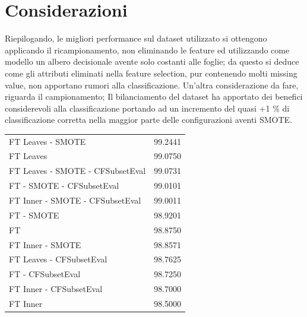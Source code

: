 \section{Considerazioni}
Riepilogando, le migliori performance sul dataset utilizzato si ottengono applicando il ricampionamento, non eliminando le feature ed utilizzando come modello un albero decisionale avente solo costanti alle foglie; da questo si deduce come gli attributi eliminati nella feature selection, pur contenendo molti missing value, non apportano rumori alla classificazione.
Un'altra considerazione da fare, riguarda il campionamento; Il bilanciamento del dataset ha apportato dei benefici considerevoli alla classificazione portando ad un incremento del quasi +1 \% di classificazione corretta nella maggior parte delle configurazioni aventi SMOTE.

\begin{table}[htbp]
	\begin{tabular}{l r}
		FT Leaves - SMOTE & 99.2441 \\
		FT Leaves & 99.0750 \\
		FT Leaves - SMOTE - CFSubsetEval & 99.0731 \\
		FT - SMOTE - CFSubsetEval & 99.0101 \\
		FT Inner - SMOTE - CFSubsetEval & 99.0011 \\		
		FT - SMOTE & 98.9201 \\
		FT & 98.8750 \\
		FT Inner - SMOTE & 98.8571 \\
		FT Leaves - CFSubsetEval & 98.7625 \\ 
		FT - CFSubsetEval & 98.7250 \\
		FT Inner - CFSubsetEval & 98.7000 \\
		FT Inner & 98.5000 \\
	\end{tabular}
\end{table}